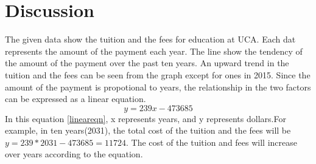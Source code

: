\section{Discussion}
The given data show the tuition and the fees for education at UCA. Each dat represents the amount of the payment each year. The line show the tendency of the amount of the payment over the past ten years. An upward trend in the tuition and the fees can be seen from the graph except for ones in 2015. Since the amount of the payment is propotional to years, the relationship in the two factors can be expressed as a linear equation.
\begin{equation}
	y=239x-473685
	\label{lineareqn}
\end{equation}
In this equation \ref{lineareqn}, x represents years, and y represents dollars.For example, in ten years(2031), the total cost of the tuition and the fees will be $y=239*2031-473685=11724$. The cost of the tuition and fees will increase over years according to the equation. 


